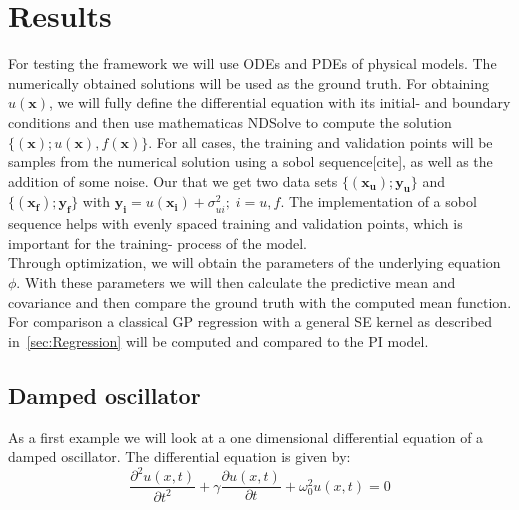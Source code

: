 \documentclass{article}
\begin{document}
\section{Results}
For testing the framework we will use ODEs and PDEs of physical models. The numerically obtained solutions will be used as the ground truth. For obtaining $u(\bm{x})$, we will fully define the differential equation with its initial- and boundary conditions and then use mathematicas NDSolve to compute the solution $\{(\bm{x});u(\bm{x}),f(\bm{x})\}$. For all cases, the training and validation points will be samples from the numerical solution using a sobol sequence[cite], as well as the addition of some noise. Our  that we get two data sets $\{(\bm{x_u});\bm{y_u}\}$ and $\{(\bm{x_f});\bm{y_f}\}$ with $\bm{y_i} = u(\bm{x_i}) + \sigma_{ui}^2 ; \; i = u,f$. The implementation of a sobol sequence helps with evenly spaced training and validation points, which is important for the training- process of the model. \\
Through optimization, we will obtain the parameters of the underlying equation $\phi$. With these parameters we will then calculate the predictive mean and covariance and then compare the ground truth with the computed mean function. For comparison a classical GP regression with a general SE kernel as described in~\ref{sec:Regression} will be computed and compared to the PI model.
\subsection{Damped oscillator}
As a first example we will look at a one dimensional differential equation of a damped oscillator. The differential equation is given by:
\begin{equation}
    \frac{\partial^2 u(x,t)}{\partial t^2} + \gamma \frac{\partial u(x,t)}{\partial t} + \omega_0^2 u(x,t) = 0
\end{equation}
\end{document}
